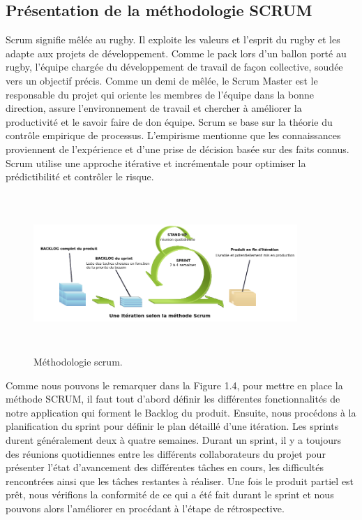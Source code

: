   \subsection{Pr\'{e}sentation de la m\'{e}thodologie SCRUM}
Scrum signifie m\^{e}l\'{e}e au rugby. \newline
Il exploite les valeurs et l'esprit du rugby et les adapte aux
projets de d\'{e}veloppement.\newline
 Comme le pack lors d'un ballon port\'{e} au rugby, l'\'{e}quipe charg\'{e}e du
d\'{e}veloppement de travail de fa\c{c}on collective, soud\'{e}e vers un objectif pr\'{e}cis. \newline
Comme un demi de m\^{e}l\'{e}e, le Scrum Master est le responsable du projet qui oriente les membres de l'\'{e}quipe dans
la bonne direction, assure l'environnement de travail et chercher \`{a} am\'{e}liorer la productivit\'{e} et
le savoir faire de don \'{e}quipe.\newline
Scrum se base sur la th\'{e}orie du contr\^{o}le empirique de processus. L'empirisme mentionne que
les connaissances proviennent de l'exp\'{e}rience et d'une prise de d\'{e}cision bas\'{e}e sur des faits
connus. \newline
Scrum utilise une approche it\'{e}rative et incr\'{e}mentale pour optimiser la pr\'{e}dictibilit\'{e} et
contr\^{o}ler le risque.
\begin{figure}[H]
\center
\includegraphics[width=10cm,height=6cm]{./figures/scrum.png}
\caption{M\'{e}thodologie scrum.}

\end{figure}

Comme nous pouvons le remarquer dans la Figure 1.4, pour mettre en place la m\'{e}thode
SCRUM, il faut tout d'abord d\'{e}finir les diff\'{e}rentes fonctionnalit\'{e}s de notre application qui
forment le Backlog du produit. Ensuite, nous proc\'{e}dons \`{a} la planification du sprint pour d\'{e}finir
le plan d\'{e}taill\'{e} d'une it\'{e}ration. Les sprints durent g\'{e}n\'{e}ralement deux \`{a} quatre semaines.\newline
 Durant un sprint, il y a toujours des r\'{e}unions quotidiennes entre les diff\'{e}rents collaborateurs du projet
pour pr\'{e}senter l'\'{e}tat d'avancement des diff\'{e}rentes t\^{a}ches en cours, les difficult\'{e}s rencontr\'{e}es
ainsi que les t\^{a}ches restantes \`{a} r\'{e}aliser. Une fois le produit partiel est pr\^{e}t, nous v\'{e}rifions la
conformit\'{e} de ce qui a \'{e}t\'{e} fait durant le sprint et nous pouvons alors l'am\'{e}liorer en proc\'{e}dant \`{a}
l'\'{e}tape de r\'{e}trospective.


